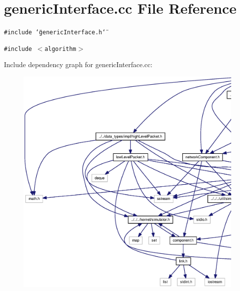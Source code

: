 \section{genericInterface.cc File Reference}
\label{genericInterface_8cc}
{\tt \#include \char`\"{}genericInterface.h\char`\"{}}\par
{\tt \#include $<$algorithm$>$}\par


Include dependency graph for genericInterface.cc:\nopagebreak
\begin{figure}[H]
\begin{center}
\leavevmode
\includegraphics[width=420pt]{genericInterface_8cc__incl}
\end{center}
\end{figure}
